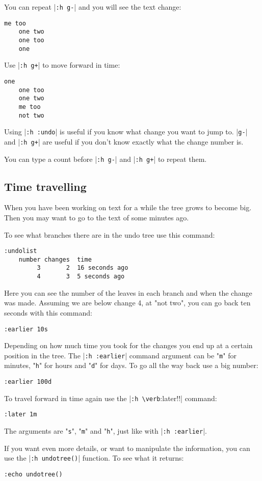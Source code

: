 You can repeat |\verb!:h g-!| and you will see the text change:

\begin{Verbatim}[samepage=true]
    me too 
    one two 
    one too 
    one 
\end{Verbatim}

Use |\verb!:h g+!| to move forward in time:

\begin{Verbatim}[samepage=true]
    one 
    one too 
    one two 
    me too 
    not two 
\end{Verbatim}

Using |\verb!:h :undo!| is useful if you know what change you want to jump to.
|\verb!g-!| and |\verb!:h g+!| are useful if you don't know exactly what the change number is.

You can type a count before |\verb!:h g-!| and |\verb!:h g+!| to repeat them.
\subsection{Time travelling}
When you have been working on text for a while the tree grows to become big.
Then you may want to go to the text of some minutes ago.

To see what branches there are in the undo tree use this command:

\begin{Verbatim}[samepage=true]
 :undolist
    number changes  time 
         3       2  16 seconds ago
         4       3  5 seconds ago
\end{Verbatim}

Here you can see the number of the leaves in each branch and when the change was made.
Assuming we are below change 4, at "not two", you can go back ten seconds with this command:

\begin{Verbatim}[samepage=true]
 :earlier 10s
\end{Verbatim}

Depending on how much time you took for the changes you end up at a certain position in the tree.
The |\verb!:h :earlier!| command argument can be "\verb!m!" for minutes, "\verb!h!" for hours and "\verb!d!" for days.
To go all the way back use a big number:

\begin{Verbatim}[samepage=true]
 :earlier 100d
\end{Verbatim}

To travel forward in time again use the |\verb!:h \verb!:later!!| command:

\begin{Verbatim}[samepage=true]
 :later 1m
\end{Verbatim}

The arguments are "\verb!s!", "\verb!m!" and "\verb!h!", just like with |\verb!:h :earlier!|.

If you want even more details, or want to manipulate the information, you can use the |\verb!:h undotree()!| function.
To see what it returns:

\begin{Verbatim}[samepage=true]
 :echo undotree()
\end{Verbatim}
\clearpage
